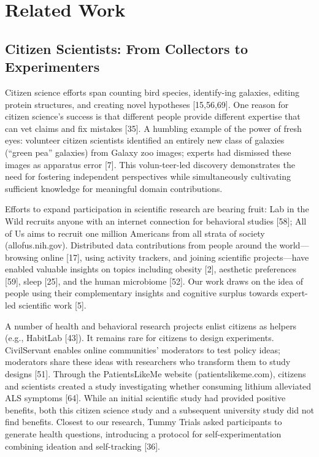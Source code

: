\section{Related Work}
\subsection{Citizen Scientists: From Collectors to Experimenters}
Citizen science efforts span counting bird species, identify-ing galaxies, editing protein structures, and creating novel hypotheses [15,56,69]. One reason for citizen science’s success is that different people provide different expertise that can vet claims and fix mistakes [35]. A humbling example of the power of fresh eyes: volunteer citizen scientists identified an entirely new class of galaxies (“green pea” galaxies) from Galaxy zoo images; experts had dismissed these images as apparatus error [7]. This volun-teer-led discovery demonstrates the need for fostering independent perspectives while simultaneously cultivating sufficient knowledge for meaningful domain contributions. 

Efforts to expand participation in scientific research are bearing fruit: Lab in the Wild recruits anyone with an internet connection for behavioral studies [58]; All of Us aims to recruit one million Americans from all strata of society (allofus.nih.gov). Distributed data contributions from people around the world—browsing online [17], using activity trackers, and joining scientific projects—have enabled valuable insights on topics including obesity [2], aesthetic preferences [59], sleep [25], and the human microbiome [52]. Our work draws on the idea of people using their complementary insights and cognitive surplus towards expert-led scientific work [5].

A number of health and behavioral research projects enlist citizens as helpers (e.g., HabitLab [43]). It remains rare for citizens to design experiments. CivilServant enables online communities’ moderators to test policy ideas; moderators share these ideas with researchers who transform them to study designs [51]. Through the PatientsLikeMe website (patientslikeme.com), citizens and scientists created a study investigating whether consuming lithium alleviated ALS symptoms [64]. While an initial scientific study had provided positive benefits, both this citizen science study and a subsequent university study did not find benefits. Closest to our research, Tummy Trials asked participants to generate health questions, introducing a protocol for self-experimentation combining ideation and self-tracking [36].

